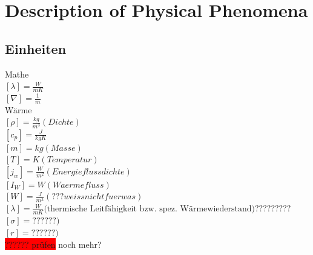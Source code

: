\documentclass[a4paper]{scrartcl}
\begin{document}
\newpage
\tableofcontents

\newpage

\section{Description of Physical Phenomena}
\subsection{Einheiten}

Mathe\\
$ [\lambda]=\frac{W}{mK} $\\
$ [\nabla]=\frac{1}{m} $\\

Wärme\\
$ [\rho]=\frac{kg}{m^3} (Dichte)$\\
$ [c_p]=\frac{J}{kgK} $\\
$ [m]=kg (Masse)$\\
$ [T]=K (Temperatur)$\\
$ [j_w]=\frac{W}{m^2} (Energieflussdichte)$\\
$ [I_W]=W (Waermefluss)$\\
$ [W]=\frac{J}{m^3} (???weiss nicht fuer was)$\\
$ [ \lambda ] = \frac{W}{mK} \text{(thermische Leitfähigkeit bzw. spez.  Wärmewiederstand)}????????? $\\
$ [ \sigma ]=??? ???)$\\
$ [ r ]=??? ???)$\\
\colorbox{red}{?????? prüfen} noch mehr? \\
\end{document}
